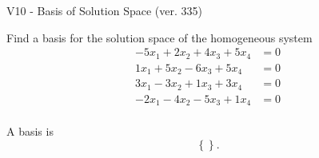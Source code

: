 \begin{exercise}
  \begin{exerciseTitle}V10 - Basis of Solution Space (ver. 335)\end{exerciseTitle}
  \begin{exerciseStatement}
    Find a basis for the solution space of the homogeneous system 
\begin{align*}
 -5 x_ 1 + 2 x_ 2 + 4 x_ 3 + 5 x_ 4 &= 0  \\ 
  1 x_ 1 + 5 x_ 2 -6 x_ 3 + 5 x_ 4 &= 0  \\ 
  3 x_ 1 -3 x_ 2 + 1 x_ 3 + 3 x_ 4 &= 0  \\ 
  -2 x_ 1 -4 x_ 2 -5 x_ 3 + 1 x_ 4 &= 0  \\ 
 \end{align*}


 
  \end{exerciseStatement}

  \begin{exerciseAnswer}
   A basis is   
\[\left\{\right\}.\]

  


  \end{exerciseAnswer}
\end{exercise}